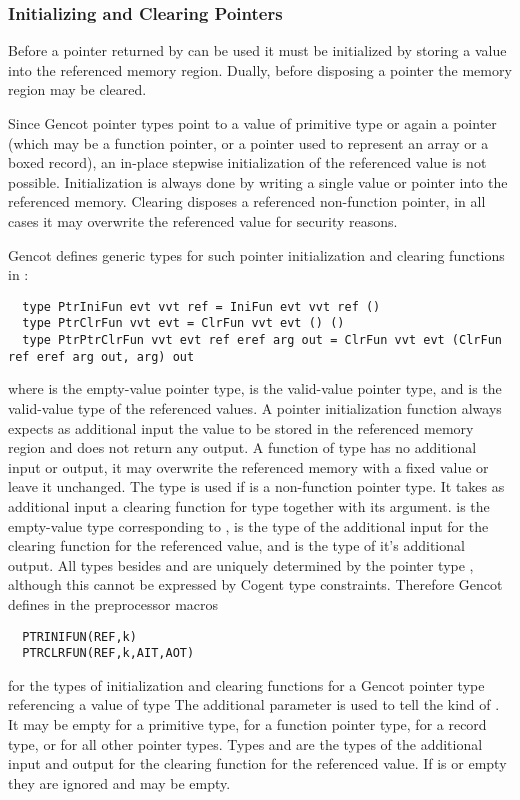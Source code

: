 \subsubsection{Initializing and Clearing Pointers}

Before a pointer returned by  can be used it must be initialized by storing a value into the referenced memory region.
Dually, before disposing a pointer the memory region may be cleared.

Since Gencot pointer types  point to a value of primitive type or again a pointer (which may be a function pointer,
or a pointer used to represent an array or a boxed record), an in-place
stepwise initialization of the referenced value is not possible. Initialization is always done by writing a single value or pointer
into the referenced memory. Clearing disposes a referenced non-function pointer, in all cases it may overwrite the referenced value
for security reasons.

Gencot defines generic types for such pointer initialization and clearing functions in :
\begin{verbatim}
  type PtrIniFun evt vvt ref = IniFun evt vvt ref ()
  type PtrClrFun vvt evt = ClrFun vvt evt () ()
  type PtrPtrClrFun vvt evt ref eref arg out = ClrFun vvt evt (ClrFun ref eref arg out, arg) out
\end{verbatim}
where  is the empty-value pointer type,  is the valid-value pointer type, and  is the valid-value
type of the referenced values. A pointer initialization function always expects as additional input the value to be stored in
the referenced memory region and does not return any output. A function of type  has no additional input or output, it may overwrite the referenced memory
with a fixed value or leave it unchanged. The type  is used if  is a non-function pointer type. It takes 
as additional input a clearing function for type  together with its argument.  is the empty-value type
corresponding to ,  is the type of the additional input for the clearing function for the referenced value,
and  is the type of it's additional output.
All types besides  and  are uniquely determined by the 
pointer type , although this cannot be expressed by Cogent type constraints. Therefore Gencot  defines in 
 the preprocessor macros
\begin{verbatim}
  PTRINIFUN(REF,k)
  PTRCLRFUN(REF,k,AIT,AOT)
\end{verbatim}
for the types of initialization and clearing functions for a Gencot pointer type referencing a value of type 
The additional parameter  is used to tell the kind of . It may be empty for a primitive type,
 for a function pointer type,  for a record type, or  for all other pointer types. Types 
and 
are the types of the additional input and output for the clearing function for the referenced value. If  is  or
empty they are ignored and may be empty.

